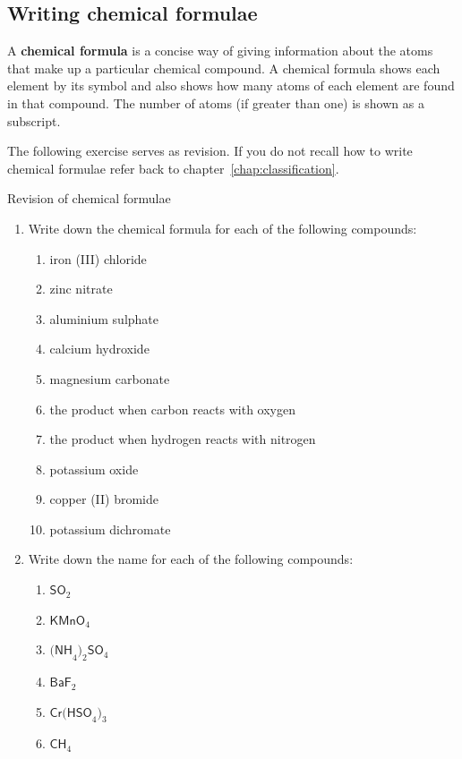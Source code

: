 \subsection*{Writing chemical formulae}
\nopagebreak
\label{m38721*id62835}A \textbf{chemical formula} is a concise way of giving information about the atoms that make up a particular chemical compound. A chemical formula shows each element by its symbol and also shows how many atoms of each element are found in that compound. The number of atoms (if greater than one) is shown as a subscript.\par 
The following exercise serves as revision. If you do not recall how to write chemical formulae refer back to chapter~\ref{chap:classification}.
\begin{exercises}{Revision of chemical formulae}
\begin{enumerate}[noitemsep, label=\textbf{\arabic*}.]
  \item Write down the chemical formula for each of the following compounds:
\begin{enumerate}[noitemsep, label=\textbf{\alph*}. ]
 \item iron (III) chloride
\item zinc nitrate
\item aluminium sulphate
\item calcium hydroxide
\item magnesium carbonate
\item the product when carbon reacts with oxygen
\item the product when hydrogen reacts with nitrogen
\item potassium oxide
\item copper (II) bromide
\item potassium dichromate
\end{enumerate}
\item Write down the name for each of the following compounds:
\begin{enumerate}[noitemsep, label=\textbf{\alph*}. ]
 \item $\mathsf{SO}_2$
\item $\mathsf{KMnO}_4$
\item $\mathsf{(NH}_{4}\mathsf{)}_{2}\mathsf{SO}_{4}$
\item $\mathsf{BaF}_2$
\item $\mathsf{Cr(HSO}_{4}\mathsf{)}_{3}$
\item $\mathsf{CH}_{4}$
\end{enumerate}
\end{enumerate}

\end{exercises}

